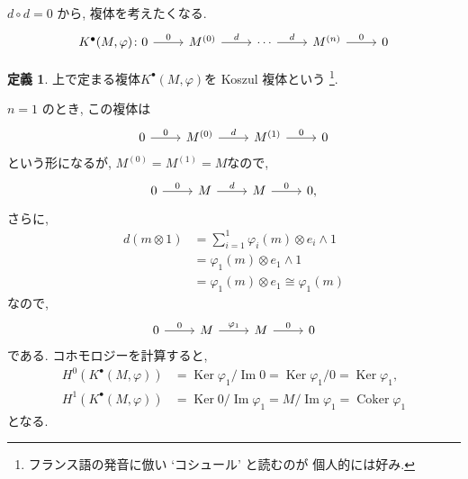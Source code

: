\documentclass[11pt, a4paper, dvipdfmx]{jsarticle}
\theoremstyle{definition}
\newtheorem{Definition}[Axiom]{定義}
\newcommand{\Ker}{\mathop{\mathrm{Ker}}\nolimits}
\newcommand{\Img}{\mathop{\mathrm{Im}}\nolimits}
\newcommand{\Cok}{\mathop{\mathrm{Coker}}\nolimits}
\newcommand{\pphi}{\varphi} %
\numberwithin{equation}{section}
\begin{document}
$d\circ d = 0$ から, 複体を考えたくなる. 
\begin{equation*}
    \begin{tikzcd}
        K^{\bullet}(M,\pphi)\colon 
        0\arrow[left]{r}{0}&M^{(0)} 
        \arrow[left]{r}{d}&
        \cdots 
        \arrow[left]{r}{d}&M^{(n)}
        \arrow[left]{r}{0}&0
    \end{tikzcd}
\end{equation*}

\begin{Definition}
    上で定まる複体$K^\bullet(M,\pphi)$を 
    Koszul 複体という
    \footnote{
        フランス語の発音に倣い `コシュール' と読むのが
        個人的には好み. 
    }. 
\end{Definition}

$n = 1$ のとき, この複体は
\begin{equation*}
    \begin{tikzcd}
         0\arrow[left]{r}{0}&M^{(0)} 
         \arrow[left]{r}{d}&M^{(1)}
         \arrow[left]{r}{0}&0
    \end{tikzcd}
\end{equation*}
という形になるが, $M^{(0)} = M^{(1)} = M$なので, 
\begin{equation*}
    \begin{tikzcd}
         0\arrow[left]{r}{0}&M 
         \arrow[left]{r}{d}&M
         \arrow[left]{r}{0}&0,
    \end{tikzcd}
\end{equation*}
さらに, 
\begin{align*}
    d(m\otimes1) 
    &= \sum_{i=1}^1\pphi_i(m)\otimes e_i\wedge1\\
    &= \pphi_1(m)\otimes e_1\wedge1\\
    &= \pphi_1(m)\otimes e_1 \cong \pphi_1(m)
\end{align*}なので, 
\begin{equation*}
    \begin{tikzcd}
         0\arrow[left]{r}{0}&M 
         \arrow[left]{r}{\pphi_1}&M
         \arrow[left]{r}{0}&0
    \end{tikzcd}
\end{equation*}
である. コホモロジーを計算すると, 
\begin{align*}
    H^0(K^\bullet(M,\pphi)) &= \Ker\pphi_1 / \Img0 
    =\Ker\pphi_1/0= \Ker\pphi_1, \\
    H^1(K^\bullet(M,\pphi)) &= \Ker0/\Img\pphi_1 = M/\Img\pphi_1 = \Cok\pphi_1
\end{align*}
となる. 
\end{document}
